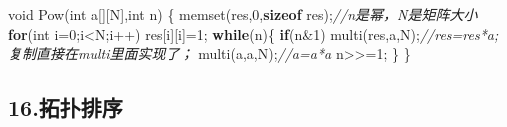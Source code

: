 \documentclass[
]{article}
\newenvironment{Shaded}{}{}
\newcommand{\CommentTok}[1]{\textcolor[rgb]{0.38,0.63,0.69}{\textit{#1}}}
\newcommand{\ControlFlowTok}[1]{\textcolor[rgb]{0.00,0.44,0.13}{\textbf{#1}}}
\newcommand{\DataTypeTok}[1]{\textcolor[rgb]{0.56,0.13,0.00}{#1}}
\newcommand{\DecValTok}[1]{\textcolor[rgb]{0.25,0.63,0.44}{#1}}
\newcommand{\KeywordTok}[1]{\textcolor[rgb]{0.00,0.44,0.13}{\textbf{#1}}}
\newcommand{\NormalTok}[1]{#1}
\newcommand{\OperatorTok}[1]{\textcolor[rgb]{0.40,0.40,0.40}{#1}}
\begin{document}
\begin{Shaded}
\begin{Highlighting}[]
\DataTypeTok{void}\NormalTok{ Pow}\OperatorTok{(}\DataTypeTok{int}\NormalTok{ a}\OperatorTok{[][}\NormalTok{N}\OperatorTok{],}\DataTypeTok{int}\NormalTok{ n}\OperatorTok{)}
\OperatorTok{\{}
\NormalTok{	memset}\OperatorTok{(}\NormalTok{res}\OperatorTok{,}\DecValTok{0}\OperatorTok{,}\KeywordTok{sizeof}\NormalTok{ res}\OperatorTok{);}\CommentTok{//n是幂，N是矩阵大小}
	\ControlFlowTok{for}\OperatorTok{(}\DataTypeTok{int}\NormalTok{ i}\OperatorTok{=}\DecValTok{0}\OperatorTok{;}\NormalTok{i}\OperatorTok{\textless{}}\NormalTok{N}\OperatorTok{;}\NormalTok{i}\OperatorTok{++)}\NormalTok{ res}\OperatorTok{[}\NormalTok{i}\OperatorTok{][}\NormalTok{i}\OperatorTok{]=}\DecValTok{1}\OperatorTok{;}
	\ControlFlowTok{while}\OperatorTok{(}\NormalTok{n}\OperatorTok{)\{}
		\ControlFlowTok{if}\OperatorTok{(}\NormalTok{n}\OperatorTok{\&}\DecValTok{1}\OperatorTok{)}\NormalTok{ multi}\OperatorTok{(}\NormalTok{res}\OperatorTok{,}\NormalTok{a}\OperatorTok{,}\NormalTok{N}\OperatorTok{);}\CommentTok{//res=res*a;复制直接在multi里面实现了；}
\NormalTok{		multi}\OperatorTok{(}\NormalTok{a}\OperatorTok{,}\NormalTok{a}\OperatorTok{,}\NormalTok{N}\OperatorTok{);}\CommentTok{//a=a*a}
\NormalTok{		n}\OperatorTok{\textgreater{}\textgreater{}=}\DecValTok{1}\OperatorTok{;}
	\OperatorTok{\}}
\OperatorTok{\}}
\end{Highlighting}
\end{Shaded}

\hypertarget{16ux62d3ux6251ux6392ux5e8f}{%
\subsection{16.拓扑排序}\label{16ux62d3ux6251ux6392ux5e8f}}
\end{document}
